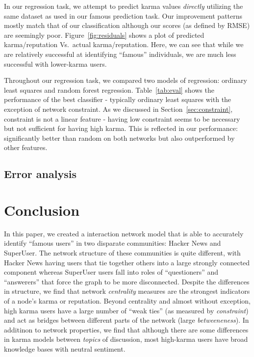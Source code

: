 \documentclass[11pt]{article}
\begin{document}
In our regression task, we attempt to predict karma values \textit{directly}
utilizing the same dataset as used in our famous prediction task. Our
improvement patterns mostly match that of our classification although our scores
(as defined by RMSE) are seemingly poor. Figure~\ref{fig:residuals} shows a plot
of predicted karma/reputation Vs.\ actual karma/reputation. Here, we can see that
while we are relatively successful at identifying ``famous'' individuals, we are
much less successful with lower-karma users.

Throughout our regression task, we compared two models of regression: ordinary least
squares  and random forest regression. Table~\ref{tab:eval} shows the performance of 
the best classifier - typically ordinary least squares with the exception of network
constraint. As we discussed in Section~\ref{sec:constraint}, constraint is not
a linear feature - having low constraint seems to be necessary but not sufficient
for having high karma. This is reflected in our performance: significantly better
than random on both networks but also outperformed by other features.


\subsection{Error analysis}

\section{Conclusion}

In this paper, we created a interaction network model that is able to accurately
identify ``famous users'' in two disparate communities: Hacker News and
SuperUser. The network structure of these communities is quite different, with
Hacker News having users that tie together others into a large strongly
connected component whereas SuperUser users fall into roles of ``questioners''
and ``answerers'' that force the graph to be more disconnected. Despite the
differences in structure, we find that network \textit{centrality} measures are
the strongest indicators of a node's karma or reputation. Beyond centrality and
almost without exception, high karma users have a large number of ``weak ties''
(as measured by \textit{constraint}) and act as bridges between different parts
of the network (large \textit{betweeneness}). In additinon to network
properties, we find that although there are some differences in karma models
between \textit{topics} of discussion, most high-karma users have broad
knowledge bases with neutral sentiment. 
\end{document}
